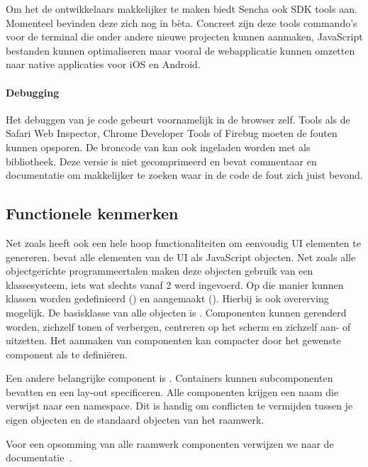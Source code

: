 Om het de ontwikkelaars makkelijker te maken biedt Sencha ook SDK tools aan.  
Momenteel bevinden deze zich nog in bèta.  
Concreet zijn deze tools commando's voor de terminal die onder andere nieuwe projecten kunnen aanmaken, JavaScript bestanden kunnen optimaliseren maar vooral de webapplicatie kunnen omzetten naar native applicaties voor iOS en Android.

\paragraph{Debugging}
Het debuggen van je code gebeurt voornamelijk in de browser zelf.  
Tools als de Safari Web Inspector,  Chrome Developer Tools of Firebug moeten de fouten kunnen opsporen.  
De broncode van \st{} kan ook ingeladen worden met  als bibliotheek.  
Deze versie is niet gecomprimeerd en bevat commentaar en documentatie om makkelijker te zoeken waar in de code de fout zich juist bevond.

\subsection{Functionele kenmerken}
Net zoals \jqm{} heeft \st{} ook een hele hoop functionaliteiten om eenvoudig UI elementen te genereren.  
\st{} bevat alle elementen van de UI als JavaScript objecten.  
Net zoals alle objectgerichte programmeertalen maken deze objecten gebruik van een klassesysteem,  iets wat slechts vanaf \st{} 2 werd ingevoerd.  
Op die manier kunnen klassen worden gedefinieerd () en aangemaakt ().  
Hierbij is ook overerving mogelijk.  
De basisklasse van alle objecten is .  
Componenten kunnen gerenderd worden, zichzelf tonen of verbergen,  centreren op het scherm en zichzelf aan- of uitzetten.   
Het aanmaken van componenten kan compacter door het gewenste component als  te definiëren.  

Een andere belangrijke component is .  
Containers kunnen subcomponenten bevatten en een lay-out specificeren.  
Alle componenten krijgen een naam die verwijst naar een namespace.  
Dit is handig om conflicten te vermijden tussen je eigen objecten en de standaard objecten van het raamwerk.  

Voor een opsomming van alle raamwerk componenten verwijzen we naar de documentatie~\cite{Inc.2013a}.


